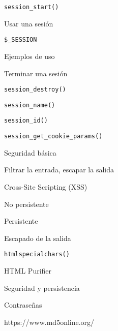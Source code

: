 \begin{longenum}
\begin{longenum}
\begin{longenum}
\begin{longenum}
                \item \texttt{session\_start()}
            \end{longenum}
            \item Usar una sesión
            \begin{longenum}
                \item \texttt{\$\_SESSION}
                \item Ejemplos de uso
            \end{longenum}
            \item Terminar una sesión
            \begin{longenum}
                \item \texttt{session\_destroy()}
                \item \texttt{session\_name()}
                \item \texttt{session\_id()}
                \item \texttt{session\_get\_cookie\_params()}
            \end{longenum}
        \end{longenum}
        \item Seguridad básica
        \begin{longenum}
            \item Filtrar la entrada, escapar la salida
            \item Cross-Site Scripting (XSS)
            \begin{longenum}
                \item No persistente
                \item Persistente
                \item Escapado de la salida
                \begin{longenum}
                    \item \texttt{htmlspecialchars()}
                    \item HTML Purifier
                \end{longenum}
            \end{longenum}
        \end{longenum}
        \item Seguridad y persistencia
        \begin{longenum}
            \item Contraseñas
            \begin{longenum}
                \item https://www.md5online.org/

\end{longenum}
\end{longenum}
\end{longenum}
\end{longenum}

